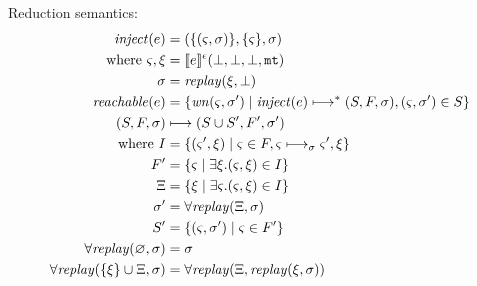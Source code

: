 \documentclass{llncs}
\newcommand{\inject}{\mathit{inject}}
\newcommand{\setof}[1]{\{ #1 \}}
\begin{document}
Reduction semantics:
\begin{align*}
\inject(\mexp) &= (\setof{\ttuple{\mstate}{\msto}}, \setof{\mstate}, \msto) \\
 \text{ where } \mstate, \msdiff &= \compile{e}^{\mtcntr}(\bot,\bot,\bot,\kmt) \\
                \msto &= \replay(\msdiff,\bot) \\
\reachable{\mexp} &= \setof{\wn(\mstate,\msto') \mid
                             \inject(\mexp) \machstep^* (S,F,\msto),
                             \ttuple{\mstate}{\msto'} \in S} \\
(S,F,\msto) &\machstep (S \cup S', F', \msto') \\
 \text{ where } I &=
   \setof{ \ttuple{\mstate'}{\msdiff} \mid \mstate \in F, \mstate \machstep_\msto \mstate', \msdiff} \\
   F' &= \setof{\mstate \mid \exists \msdiff. \ttuple{\mstate}{\msdiff} \in I} \\
   \Xi &= \setof{\msdiff \mid \exists \mstate. \ttuple{\mstate}{\msdiff} \in I} \\
   \msto' &= \replayall(\Xi,\msto) \\
   S' &= \setof{\ttuple{\mstate}{\msto'} \mid \mstate \in F'} \\
   \replayall(\varnothing,\msto) &= \msto \\
   \replayall(\setof{\msdiff} \cup \Xi, \msto) &= \replayall(\Xi, \replay(\msdiff, \msto))
\end{align*}

\end{document}
